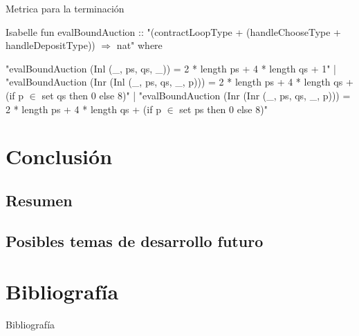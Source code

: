 \documentclass{beamer}
\begin{document}
\begin{frame}[fragile]{Metrica para la terminación}
\begin{code}{Isabelle}
fun evalBoundAuction :: "(contractLoopType + (handleChooseType + handleDepositType)) $\Rightarrow$ nat" where

"evalBoundAuction (Inl (_, ps, qs, _)) =
        2 * length ps + 4 * length qs + 1" |
"evalBoundAuction (Inr (Inl (_, ps, qs, _, p))) =
        2 * length ps + 4 * length qs + (if p $\in$ set qs then 0 else 8)" |
"evalBoundAuction (Inr (Inr (_, ps, qs, _, p))) =
        2 * length ps + 4 * length qs + (if p $\in$ set ps then 0 else 8)"
\end{code}


\end{frame}



\section{Conclusión}

\subsection{Resumen}

\subsection{Posibles temas de desarrollo futuro}


\section{Bibliografía}
\begin{frame}[allowframebreaks]{Bibliografía}
    
    
\end{frame}
\end{document}
